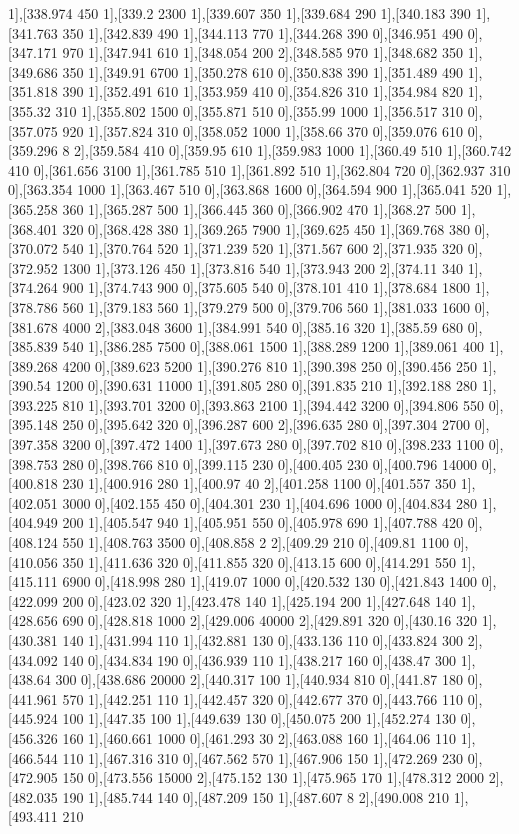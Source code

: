 {1],[338.974 450 1],[339.2 2300 1],[339.607 350 1],[339.684 290 1],[340.183 390 1],[341.763 350 1],[342.839 490 1],[344.113 770 1],[344.268 390 0],[346.951 490 0],[347.171 970 1],[347.941 610 1],[348.054 200 2],[348.585 970 1],[348.682 350 1],[349.686 350 1],[349.91 6700 1],[350.278 610 0],[350.838 390 1],[351.489 490 1],[351.818 390 1],[352.491 610 1],[353.959 410 0],[354.826 310 1],[354.984 820 1],[355.32 310 1],[355.802 1500 0],[355.871 510 0],[355.99 1000 1],[356.517 310 0],[357.075 920 1],[357.824 310 0],[358.052 1000 1],[358.66 370 0],[359.076 610 0],[359.296 8 2],[359.584 410 0],[359.95 610 1],[359.983 1000 1],[360.49 510 1],[360.742 410 0],[361.656 3100 1],[361.785 510 1],[361.892 510 1],[362.804 720 0],[362.937 310 0],[363.354 1000 1],[363.467 510 0],[363.868 1600 0],[364.594 900 1],[365.041 520 1],[365.258 360 1],[365.287 500 1],[366.445 360 0],[366.902 470 1],[368.27 500 1],[368.401 320 0],[368.428 380 1],[369.265 7900 1],[369.625 450 1],[369.768 380 0],[370.072 540 1],[370.764 520 1],[371.239 520 1],[371.567 600 2],[371.935 320 0],[372.952 1300 1],[373.126 450 1],[373.816 540 1],[373.943 200 2],[374.11 340 1],[374.264 900 1],[374.743 900 0],[375.605 540 0],[378.101 410 1],[378.684 1800 1],[378.786 560 1],[379.183 560 1],[379.279 500 0],[379.706 560 1],[381.033 1600 0],[381.678 4000 2],[383.048 3600 1],[384.991 540 0],[385.16 320 1],[385.59 680 0],[385.839 540 1],[386.285 7500 0],[388.061 1500 1],[388.289 1200 1],[389.061 400 1],[389.268 4200 0],[389.623 5200 1],[390.276 810 1],[390.398 250 0],[390.456 250 1],[390.54 1200 0],[390.631 11000 1],[391.805 280 0],[391.835 210 1],[392.188 280 1],[393.225 810 1],[393.701 3200 0],[393.863 2100 1],[394.442 3200 0],[394.806 550 0],[395.148 250 0],[395.642 320 0],[396.287 600 2],[396.635 280 0],[397.304 2700 0],[397.358 3200 0],[397.472 1400 1],[397.673 280 0],[397.702 810 0],[398.233 1100 0],[398.753 280 0],[398.766 810 0],[399.115 230 0],[400.405 230 0],[400.796 14000 0],[400.818 230 1],[400.916 280 1],[400.97 40 2],[401.258 1100 0],[401.557 350 1],[402.051 3000 0],[402.155 450 0],[404.301 230 1],[404.696 1000 0],[404.834 280 1],[404.949 200 1],[405.547 940 1],[405.951 550 0],[405.978 690 1],[407.788 420 0],[408.124 550 1],[408.763 3500 0],[408.858 2 2],[409.29 210 0],[409.81 1100 0],[410.056 350 1],[411.636 320 0],[411.855 320 0],[413.15 600 0],[414.291 550 1],[415.111 6900 0],[418.998 280 1],[419.07 1000 0],[420.532 130 0],[421.843 1400 0],[422.099 200 0],[423.02 320 1],[423.478 140 1],[425.194 200 1],[427.648 140 1],[428.656 690 0],[428.818 1000 2],[429.006 40000 2],[429.891 320 0],[430.16 320 1],[430.381 140 1],[431.994 110 1],[432.881 130 0],[433.136 110 0],[433.824 300 2],[434.092 140 0],[434.834 190 0],[436.939 110 1],[438.217 160 0],[438.47 300 1],[438.64 300 0],[438.686 20000 2],[440.317 100 1],[440.934 810 0],[441.87 180 0],[441.961 570 1],[442.251 110 1],[442.457 320 0],[442.677 370 0],[443.766 110 0],[445.924 100 1],[447.35 100 1],[449.639 130 0],[450.075 200 1],[452.274 130 0],[456.326 160 1],[460.661 1000 0],[461.293 30 2],[463.088 160 1],[464.06 110 1],[466.544 110 1],[467.316 310 0],[467.562 570 1],[467.906 150 1],[472.269 230 0],[472.905 150 0],[473.556 15000 2],[475.152 130 1],[475.965 170 1],[478.312 2000 2],[482.035 190 1],[485.744 140 0],[487.209 150 1],[487.607 8 2],[490.008 210 1],[493.411 210 }
